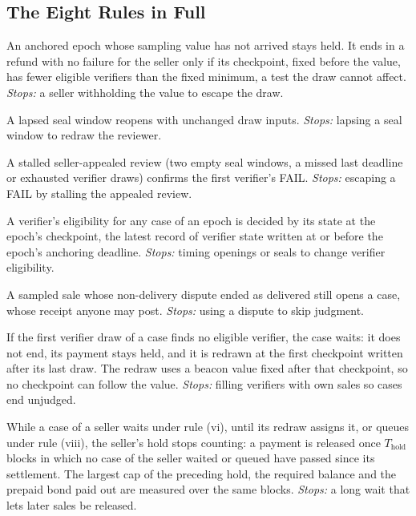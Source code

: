 \documentclass[10pt,a4paper]{article}
\newcommand{\Thold}{T_{\mathrm{hold}}}
\theoremstyle{plain}
\theoremstyle{remark}
\begin{document}
\subsection{The Eight Rules in Full}
\label{app:rules}
\begin{list}{}{\setlength{\leftmargin}{0pt}\setlength{\itemindent}{2em}\setlength{\labelwidth}{1.7em}\setlength{\labelsep}{0.3em}\setlength{\itemsep}{0pt}\setlength{\parsep}{0pt}\setlength{\topsep}{1pt}\setlength{\partopsep}{0pt}}
\item[(i)] An anchored epoch whose sampling value has not arrived stays held. It ends in a refund with no failure for the seller only if its checkpoint, fixed before the value, has fewer eligible verifiers than the fixed minimum, a test the draw cannot affect. \emph{Stops:} a seller withholding the value to escape the draw.
\item[(ii)] A lapsed seal window reopens with unchanged draw inputs. \emph{Stops:} lapsing a seal window to redraw the reviewer.
\item[(iii)] A stalled seller-appealed review (two empty seal windows, a missed last deadline or exhausted verifier draws) confirms the first verifier's FAIL. \emph{Stops:} escaping a FAIL by stalling the appealed review.
\item[(iv)] A verifier's eligibility for any case of an epoch is decided by its state at the epoch's checkpoint, the latest record of verifier state written at or before the epoch's anchoring deadline. \emph{Stops:} timing openings or seals to change verifier eligibility.
\item[(v)] A sampled sale whose non-delivery dispute ended as delivered still opens a case, whose receipt anyone may post. \emph{Stops:} using a dispute to skip judgment.
\item[(vi)] If the first verifier draw of a case finds no eligible verifier, the case waits: it does not end, its payment stays held, and it is redrawn at the first checkpoint written after its last draw. The redraw uses a beacon value fixed after that checkpoint, so no checkpoint can follow the value. \emph{Stops:} filling verifiers with own sales so cases end unjudged.
\item[(vii)] While a case of a seller waits under rule (vi), until its redraw assigns it, or queues under rule (viii), the seller's hold stops counting: a payment is released once $\Thold$ blocks in which no case of the seller waited or queued have passed since its settlement. The largest cap of the preceding hold, the required balance and the prepaid bond paid out are measured over the same blocks. \emph{Stops:} a long wait that lets later sales be released.

\end{list}
\end{document}
